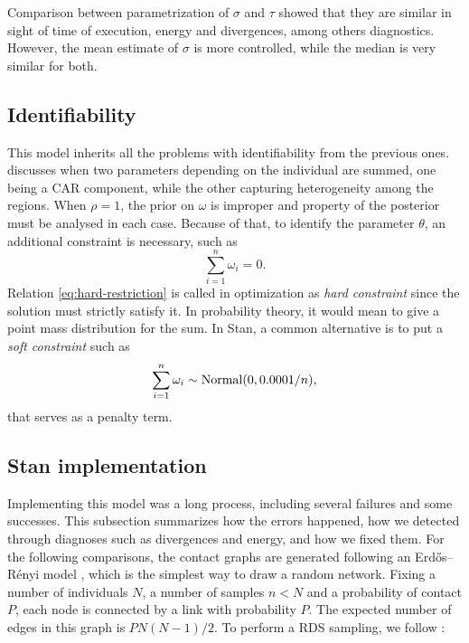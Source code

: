 Comparison between parametrization of $\sigma$ and $\tau$ showed that they are
similar in sight of time of execution, energy and divergences, among others
diagnostics. However, the mean estimate of $\sigma$ is more controlled, while
the median is very similar for both.

\subsection{Identifiability}

This model inherits all the problems with identifiability from the previous
ones. \textcite[p. 3470]{xie2006measures} discusses when two parameters depending on the individual are
summed, one being a CAR component, while the other capturing heterogeneity
among the regions. When $\rho = 1$, the prior on $\omega$ is improper and
property of the posterior must be analysed in each case. Because of that, to
identify the parameter $\theta$, an additional constraint is necessary, such
as
\begin{equation}
  \label{eq:hard-restriction}
  \sum_{i=1}^n \omega_i = 0.
\end{equation}
Relation \eqref{eq:hard-restriction} is called in optimization as {\em hard
    constraint} since the solution must strictly satisfy it. In probability
theory, it would mean to give a point mass distribution for the sum.
In Stan, a common alternative is to put a {\em soft constraint} such as
\begin{equation}
  \label{eq:soft-restriction}
  \sum_{i=1}^n \omega_i \sim \operatorname{Normal}(0, 0.0001/n),
\end{equation}
that serves as a penalty term.

\subsection{Stan implementation}
\label{sec:stan-implementation-rds}

Implementing this model was a long process, including several failures and
some successes. This subsection summarizes how the errors happened, how we
detected through diagnoses such as divergences and energy, and how we fixed
them. For the following comparisons, the contact graphs are generated
following an Erdős–Rényi model \cite{erdos1960evolution}, which is the
simplest way to draw a random network. Fixing a number of individuals $N$,
a number of samples $n < N$ and a probability of contact $P$, each node is
connected by a link with probability $P$. The expected number of edges in this
graph is $PN(N-1)/2$. To perform a RDS sampling, we follow
\textcite[p. 14670]{baraff2016estimating}:


